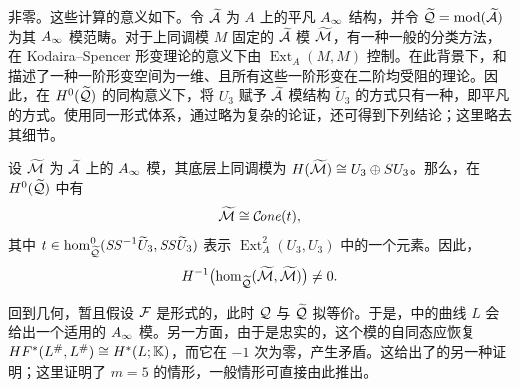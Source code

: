 非零。这些计算的意义如下。令 $\widetilde{\mathcal A}$ 为 $A$ 上的平凡 $A_\infty$ 结构，并令 $\widetilde{\mathcal Q}=\operatorname{mod}(\widetilde{\mathcal A})$ 为其 $A_\infty$ 模范畴。对于上同调模 $M$ 固定的 $\widetilde{\mathcal A}$ 模 $\widetilde{\mathcal M}$，有一种一般的分类方法，在 Kodaira--Spencer 形变理论的意义下由 $\operatorname{Ext}_{A}(M,M)$ 控制。在此背景下，和描述了一种一阶形变空间为一维、且所有这些一阶形变在二阶均受阻的理论。因此，在 $H^0(\widetilde{\mathcal Q})$ 的同构意义下，将 $U_3$ 赋予 $\widetilde{\mathcal A}$ 模结构 $\widetilde U_3$ 的方式只有一种，即平凡的方式。使用同一形式体系，通过略为复杂的论证，还可得到下列结论；这里略去其细节。
\begin{lemma}\label{st:20.6}
设 $\widetilde{\mathcal M}$ 为 $\widetilde{\mathcal A}$ 上的 $A_\infty$ 模，其底层上同调模为 $H(\widetilde{\mathcal M})\cong U_3\oplus SU_3$。那么，在 $H^0(\widetilde{\mathcal Q})$ 中有
\[
\widetilde{\mathcal M}\cong\mathcal C\!\mathit{one}(t),
\]
其中 $t\in\hom_{\widetilde{\mathcal Q}}^0(\mathit{SS}^{-1}\widetilde U_3,\mathit{SS}\widetilde U_3)$ 表示 $\operatorname{Ext}_{A}^{2}(U_3,U_3)$ 中的一个元素。因此，
\[
H^{-1}\bigl(\hom_{\widetilde{\mathcal Q}}(\widetilde{\mathcal M},\widetilde{\mathcal M})\bigr)\ne0.
\]
\end{lemma}

回到几何，暂且假设 $\mathcal F$ 是形式的，此时 $\mathcal Q$ 与 $\widetilde{\mathcal Q}$ 拟等价。于是，中的曲线 $L$ 会给出一个适用的 $A_\infty$ 模。另一方面，由于是忠实的，这个模的自同态应恢复 $HF^*(L^\#,L^\#)\cong H^*(L;\mathbb K)$，而它在 $-1$ 次为零，产生矛盾。这给出了的另一种证明；这里证明了 $m=5$ 的情形，一般情形可直接由此推出。

